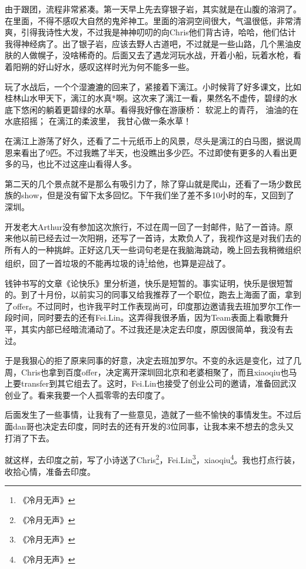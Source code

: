 由于跟团，流程非常紧凑。第一天早上先去穿银子岩，其实就是在山腹的溶洞了。在里面，不得不感叹大自然的鬼斧神工。里面的溶洞空间很大，气温很低，非常清爽，引得我诗性大发，不过我是神神叨叨的向Chris他们背古诗，哈哈，他们估计我得神经病了。出了银子岩，应该去野人古道吧，不过就是一些山路，几个黑油皮肤的人做幌子，没啥稀奇的。后面又去了遇龙河玩水战，开着小船，玩着水枪，看着阳朔的好山好水，感叹这样时光为何不能多一些。

玩了水战后，一个个湿漉漉的回来了，紧接着下漓江。小时候背了好多课文，比如桂林山水甲天下，漓江的水真*啊。这次来了漓江一看，果然名不虚传，碧绿的水底下悠闲的躺着更碧绿的水草。看得我好像在游康桥：
软泥上的青荇， 
油油的在水底招摇； 
在漓江的柔波里， 
我甘心做一条水草！ 

在漓江上游荡了好久，还看了二十元纸币上的风景，尽头是漓江的白马图，据说周恩来看出了9匹。不过我瞧了半天，也没瞧出多少匹。不过即使有更多的人看出更多的马，也比不过这座山看得人多。

第二天的几个景点就不是那么有吸引力了，除了穿山就是爬山，还看了一场少数民族的show，但是没有留下太多回忆。下午我们坐了差不多10小时的车，又回到了深圳。

开发老大Arthur没有参加这次旅行，不过在周一回了一封邮件，贴了一首诗。原来他以前已经去过一次阳朔，还写了一首诗，太欺负人了，我视作这是对我们去的所有人的一种挑衅。正好这几天一些词句老是在我脑海跳动，晚上回去我稍微组织组织，回了一首垃圾的不能再垃圾的诗\footnote{《冷月无声》}给他，也算是迎战了。

钱钟书写的文章《论快乐》里分析道，快乐是短暂的。事实证明，快乐是很短暂的。到了十月份，以前实习的同事又给我推荐了一个职位，跑去上海面了面，拿到了offer。不过同时，也许我平时工作表现尚可，印度那边邀请我去班加罗尔工作一段时间，同时要去的还有Fei.Lin。这弄得我很矛盾，因为Team表面上看歌舞升平，其实内部已经暗流涌动了。不过我还是决定去印度，原因很简单，我没有去过。

于是我狠心的拒了原来同事的好意，决定去班加罗尔。不变的永远是变化，过了几周，Chris也拿到百度offer，决定离开深圳回北京和老婆相聚了，而且xiaoqiu也马上要transfer到其它组去了。这时，Fei.Lin也接受了创业公司的邀请，准备回武汉创业了。看来我要一个人孤零零的去印度了。

后面发生了一些事情，让我有了一些意见，造就了一些不愉快的事情发生。不过后面dan哥也决定去印度，同时去的还有开发的3位同事，让我本来不想去的念头又打消了下去。

就这样，去印度之前，写了小诗送了Chris\footnote{《冷月无声》}，Fei.Lin\footnote{《冷月无声》}，xiaoqiu\footnote{《冷月无声》}。我也打点行装，收拾心情，准备去印度。


\newpage
